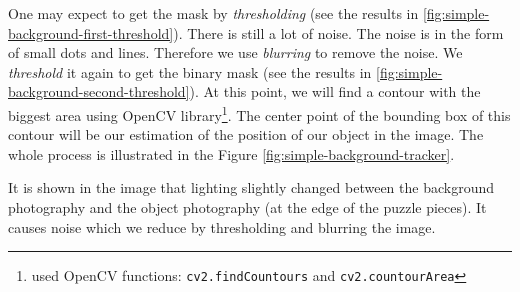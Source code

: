One may expect to get the mask by \emph{thresholding} (see the results in
\ref{fig:simple-background-first-threshold}). There is still a lot of noise.
The noise is in the form of small dots and lines. Therefore we use
\emph{blurring} to remove the noise. We \emph{threshold} it again to get the
binary mask (see the results in \ref{fig:simple-background-second-threshold}).
At this point, we will find a contour with the biggest area using OpenCV
library\footnote{used OpenCV functions: \verb+cv2.findCountours+ and
\verb+cv2.countourArea+}. The center point of the bounding box of this contour
will be our estimation of the position of our object in the image. The whole
process is illustrated in the Figure \ref{fig:simple-background-tracker}.

It is shown in the image that lighting slightly changed between the background
photography and the object photography (at the edge of the puzzle pieces). It
causes noise which we reduce by thresholding and blurring the image.

